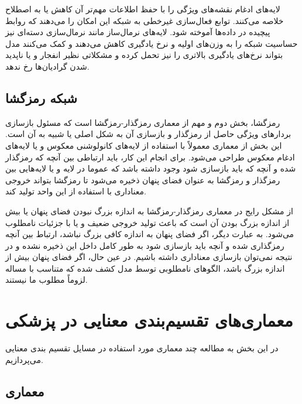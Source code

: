لایه‌های ادغام نقشه‌های ویژگی را با حفظ اطلاعات مهم‌تر آن کاهش یا به اصطلاح خلاصه می‌کنند. توابع فعال‌سازی غیرخطی
به شبکه این امکان را می‌دهند که روابط پیچیده در داده‌ها آموخته شود. لایه‌های نرمال‌ساز مانند نرمال‌سازی دسته‌ای
نیز حساسیت شبکه را به وزن‌های اولیه و نرخ یادگیری
کاهش می‌دهند و کمک می‌کنند مدل بتواند نرخ‌های یادگیری بالاتری را نیز تحمل کرده و مشکلاتی نظیر انفجار
و یا ناپدید شدن گرادیان‌ها
رخ ندهد.

\subsection{شبکه رمزگشا}

رمزگشا، بخش دوم و مهم از معماری رمزگذار-رمزگشا است که مسئول بازسازی بردارهای ویژگی حاصل از رمزگذار و بازسازی آن به شکل اصلی یا شبیه به آن است. این بخش از معماری معمولاً با استفاده از لایه‌های کانولوشنی معکوس
و یا لایه‌های ادغام معکوس
طراحی می‌شود. برای انجام این کار، باید ارتباطی بین آنچه که رمزگذار شده و آنچه که باید بازسازی شود وجود داشته باشد که عموما در لایه و یا لایه‌هایی بین رمزگذار و رمزگشا به عنوان فضای پنهان
ذخیره می‌شود تا رمزگشا بتواند خروجی معناداری با استفاده از این واحد تولید کند.

از مشکل رایج در معماری رمزگذار-رمزگشا به اندازه بزرگ نبودن فضای پنهان یا بیش از اندازه بزرگ بودن آن است که باعث تولید خروجی ضعیف و یا با جزئیات نامطلوب می‌شود. به عبارت دیگر، اگر فضای پنهان به اندازه کافی بزرگ نباشد، ارتباط بین آنچه رمزگذاری شده و آنچه باید بازسازی شود به طور کامل داخل این ذخیره نشده و در نتیجه نمی‌توان بازسازی معناداری داشته باشیم. در عین حال، اگر فضای پنهان بیش از اندازه بزرگ باشد، الگوهای نامطلوبی توسط مدل کشف شده که متناسب با مساله لزوماً مطلوب ما نیستند.

\section{معماری‌های تقسیم‌بندی معنایی در پزشکی}

در این بخش به مطالعه چند معماری مورد استفاده در مسایل تقسیم بندی معنایی می‌پردازیم.

\subsection{معماری }

